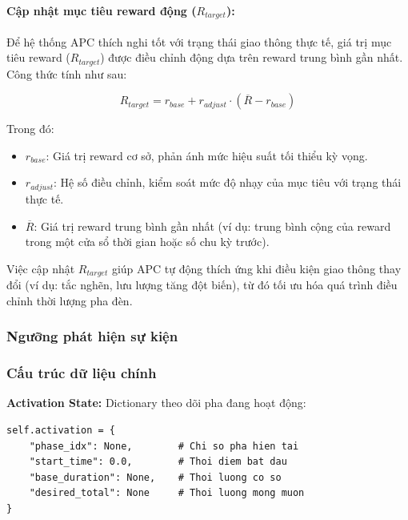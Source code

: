 \paragraph{Cập nhật mục tiêu reward động (\(R_{target}\)):}
Để hệ thống APC thích nghi tốt với trạng thái giao thông thực tế, giá trị mục tiêu reward (\(R_{target}\)) được điều chỉnh động dựa trên reward trung bình gần nhất. Công thức tính như sau:

\[
R_{target} = r_{base} + r_{adjust} \cdot (\overline{R} - r_{base})
\]

Trong đó:
\begin{itemize}
    \item \(r_{base}\): Giá trị reward cơ sở, phản ánh mức hiệu suất tối thiểu kỳ vọng.
    \item \(r_{adjust}\): Hệ số điều chỉnh, kiểm soát mức độ nhạy của mục tiêu với trạng thái thực tế.
    \item \(\overline{R}\): Giá trị reward trung bình gần nhất (ví dụ: trung bình cộng của reward trong một cửa sổ thời gian hoặc số chu kỳ trước).
\end{itemize}

Việc cập nhật \(R_{target}\) giúp APC tự động thích ứng khi điều kiện giao thông thay đổi (ví dụ: tắc nghẽn, lưu lượng tăng đột biến), từ đó tối ưu hóa quá trình điều chỉnh thời lượng pha đèn.
\subsubsection{Ngưỡng phát hiện sự kiện}

\subsubsection{Cấu trúc dữ liệu chính}

\textbf{Activation State:} Dictionary theo dõi pha đang hoạt động:
\begin{lstlisting}[style=py]
self.activation = {
    "phase_idx": None,        # Chi so pha hien tai
    "start_time": 0.0,        # Thoi diem bat dau
    "base_duration": None,    # Thoi luong co so
    "desired_total": None     # Thoi luong mong muon
}
\end{lstlisting}

